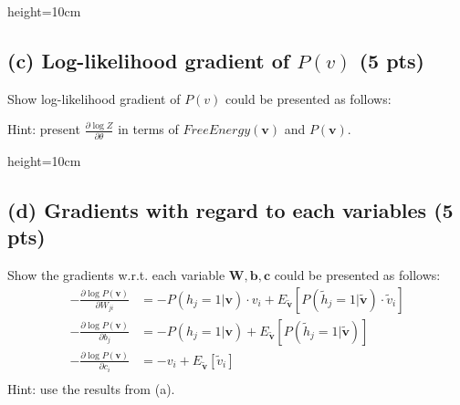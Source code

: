 \begin{soln}{height=10cm}
\end{soln}

\subsection*{(c) Log-likelihood gradient of $P(v)$ (5 pts)}
Show log-likelihood gradient of $P(v)$ could be presented as follows:
\begin{center}
\end{center}
Hint: present $\frac{\partial\log Z}{\partial\theta}$ in terms of $FreeEnergy(\textbf{v})$ and $P(\textbf{v})$.

\begin{soln}{height=10cm}
\end{soln}

\subsection*{(d) Gradients with regard to each variables (5 pts)}

Show the gradients w.r.t. each variable $\textbf{W}, \textbf{b}, \textbf{c}$ could be presented as follows:
\begin{align*}
    -\frac{\partial\log P(\textbf{v})}{\partial W_{ji}} &= - P(h_j = 1|\textbf{v}) \cdot v_i + E_{\tilde{\textbf{v}}}[P(\tilde{h}_j = 1|\tilde{\textbf{v}})\cdot \tilde{v}_i] \\
    -\frac{\partial\log P(\textbf{v})}{\partial b_j} &= - P(h_j = 1 | \textbf{v}) + E_{\tilde{\textbf{v}}}[P(\tilde{h}_j = 1 | \tilde{\textbf{v}})] \\
    -\frac{\partial\log P(\textbf{v})}{\partial c_i} &= - v_i + E_{\tilde{\textbf{v}}}[\tilde{v}_i] \\
\end{align*}
Hint: use the results from (a).

